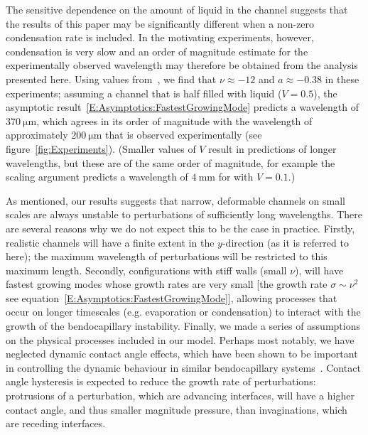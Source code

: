 \documentclass{jfm}
\newcommand{\aspect}{a} %
\begin{document}

The sensitive dependence on the amount of liquid in the channel suggests that the results of this paper may be significantly different when a non-zero condensation rate is included. In the motivating experiments, however, condensation is very slow and an order of magnitude estimate for the experimentally observed wavelength may therefore be obtained from the analysis presented here. Using values from~\cite{Seemann2011JPhysCondMat}, we find that $\nu \approx -12$ and $\aspect \approx -0.38$ in these experiments; assuming a channel that is half filled with liquid ($V = 0.5$), the asymptotic result~\eqref{E:Asymptotics:FastestGrowingMode} predicts a wavelength of $370~\si{\micro \meter}$, which agrees in its order of magnitude with the wavelength of approximately $200~\si{\micro \meter}$ that is observed experimentally (see figure~\ref{fig:Experiments}). (Smaller values of $V$ result in predictions of longer wavelengths, but these are of the same order of magnitude, for example the scaling argument predicts a wavelength of $4~\si{\milli \meter}$ for  with $V = 0.1$.) 

As mentioned, our results suggests that narrow, deformable channels on small scales are always unstable to perturbations of sufficiently long wavelengths. There are several reasons why we do not expect this to be the case in practice. Firstly, realistic channels will have a finite extent in the $y$-direction (as it is referred to here); the maximum wavelength of perturbations will be restricted to this maximum length. Secondly, configurations with stiff walls (small $\nu$), will have fastest growing modes whose growth rates are very small [the growth rate $\sigma \sim \nu^2$ see equation~\eqref{E:Asymptotics:FastestGrowingMode}], allowing processes that occur on longer timescales (e.g. evaporation or condensation) to interact with the growth of the bendocapillary instability. Finally, we made a series of assumptions on the physical processes included in our model. Perhaps most notably, we have neglected dynamic contact angle effects, which have been shown to be important in controlling the dynamic behaviour in similar bendocapillary systems~\citep[e.g][]{Bradley2021PRF}. Contact angle hysteresis is expected to reduce the growth rate of perturbations: protrusions of a perturbation, which are advancing interfaces, will have a higher contact angle, and thus smaller magnitude pressure, than invaginations, which are receding interfaces.
\end{document}
